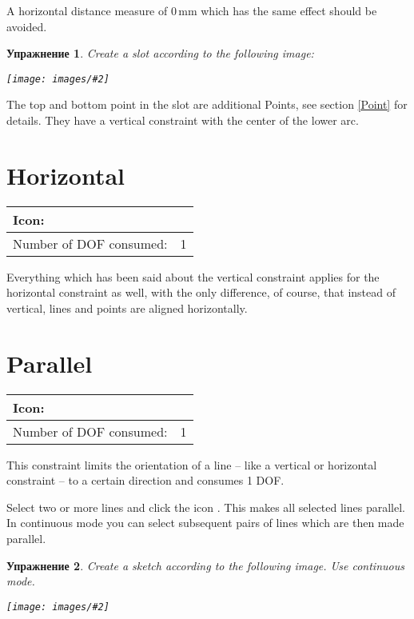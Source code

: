 \documentclass[12pt,titlepage]{article}
\newcommand{\icon}[1]{\raisebox{-1em}{\rule{0pt}{27pt}\texttt{[image: images/\#1]}}}
\newcommand{\img}[2]{\vspace{2ex}\noindent\texttt{[image: images/\#2]}}
\newcommand{\dofConsumed}{Number of DOF consumed:}
\newtheorem{Exercise}{Упражнение}
\begin{document}
\begin {itemize}
\begin{itemize}
      A horizontal distance measure of 0\,mm which has the same effect should be avoided.
\end{itemize}

\begin{Exercise}
Create a slot according to the following image:

\img{scale=0.7}{VerticalPoints}
\end{Exercise}
The top and bottom point in the slot are additional Points, see section \vref{Point}
for details. They have a vertical constraint with the center of the lower arc.


\section{Horizontal}
\label{Horizontal}
\begin{tabular}{|l|l|}
\hline
Icon: & \icon{Constraint_Horizontal}\\
\hline
\dofConsumed & 1 \\
\hline
\end{tabular}

Everything which has been said about the vertical constraint applies for the
horizontal constraint as well, with the only difference, of course, that instead of
vertical, lines and points are aligned horizontally.

\section{Parallel}
\begin{tabular}{|l|l|}
\hline
Icon: & \icon{Constraint_Parallel}\\
\hline
\dofConsumed & 1 \\
\hline
\end{tabular}

This constraint limits the orientation of a line -- like a vertical or horizontal constraint -- to
a certain direction and consumes 1 DOF.

Select two or more lines and click the icon \icon{Constraint_Parallel}. This makes
all selected lines parallel. In continuous mode you can select subsequent pairs of
lines which are then made parallel.

\begin{Exercise}
Create a sketch according to the following image. Use continuous mode.

\img{width=0.6\textwidth}{Parallelogramm}
\end{Exercise}


\end{itemize}
\end{document}

